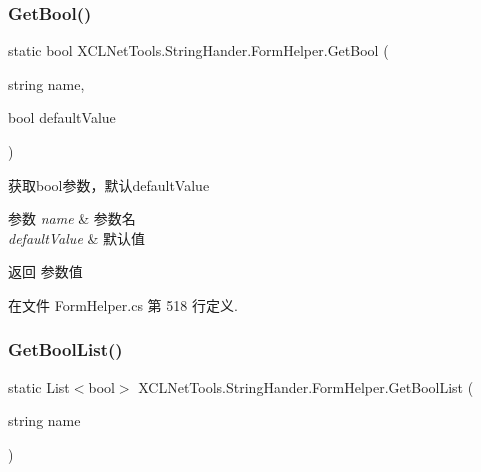 \subsubsection{\texorpdfstring{Get\+Bool()}{GetBool()}\hspace{0.1cm}{\footnotesize\ttfamily [2/2]}}
{\footnotesize\ttfamily static bool X\+C\+L\+Net\+Tools.\+String\+Hander.\+Form\+Helper.\+Get\+Bool (\begin{DoxyParamCaption}\item[{string}]{name,  }\item[{bool}]{default\+Value }\end{DoxyParamCaption})\hspace{0.3cm}{\ttfamily [static]}}



获取bool参数，默认default\+Value 


\begin{DoxyParams}{参数}
{\em name} & 参数名\\
\hline
{\em default\+Value} & 默认值\\
\hline
\end{DoxyParams}
\begin{DoxyReturn}{返回}
参数值
\end{DoxyReturn}


在文件 Form\+Helper.\+cs 第 518 行定义.

\mbox{\label{class_x_c_l_net_tools_1_1_string_hander_1_1_form_helper_a134c9765f209b53268358ab4f2bf2821}} 
\subsubsection{\texorpdfstring{Get\+Bool\+List()}{GetBoolList()}}
{\footnotesize\ttfamily static List$<$bool$>$ X\+C\+L\+Net\+Tools.\+String\+Hander.\+Form\+Helper.\+Get\+Bool\+List (\begin{DoxyParamCaption}\item[{string}]{name }\end{DoxyParamCaption})\hspace{0.3cm}{\ttfamily [static]}}



